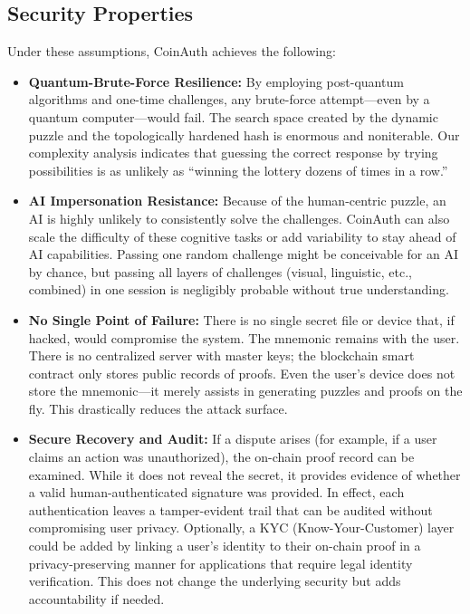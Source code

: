 \documentclass[10pt,letterpaper]{article}
\begin{document}
\subsection*{Security Properties}
Under these assumptions, CoinAuth achieves the following:
\begin{itemize}
    \item \textbf{Quantum-Brute-Force Resilience:} By employing post-quantum algorithms and one-time challenges, any brute-force attempt—even by a quantum computer—would fail. The search space created by the dynamic puzzle and the topologically hardened hash is enormous and noniterable. Our complexity analysis indicates that guessing the correct response by trying possibilities is as unlikely as “winning the lottery dozens of times in a row.”
    \item \textbf{AI Impersonation Resistance:} Because of the human-centric puzzle, an AI is highly unlikely to consistently solve the challenges. CoinAuth can also scale the difficulty of these cognitive tasks or add variability to stay ahead of AI capabilities. Passing one random challenge might be conceivable for an AI by chance, but passing all layers of challenges (visual, linguistic, etc., combined) in one session is negligibly probable without true understanding.
    \item \textbf{No Single Point of Failure:} There is no single secret file or device that, if hacked, would compromise the system. The mnemonic remains with the user. There is no centralized server with master keys; the blockchain smart contract only stores public records of proofs. Even the user’s device does not store the mnemonic—it merely assists in generating puzzles and proofs on the fly. This drastically reduces the attack surface.
    \item \textbf{Secure Recovery and Audit:} If a dispute arises (for example, if a user claims an action was unauthorized), the on-chain proof record can be examined. While it does not reveal the secret, it provides evidence of whether a valid human-authenticated signature was provided. In effect, each authentication leaves a tamper-evident trail that can be audited without compromising user privacy. Optionally, a KYC (Know-Your-Customer) layer could be added by linking a user’s identity to their on-chain proof in a privacy-preserving manner for applications that require legal identity verification. This does not change the underlying security but adds accountability if needed.
\end{itemize}
\end{document}

